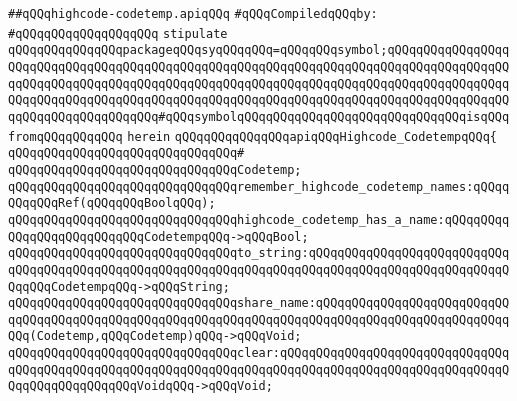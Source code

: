 \label{src/lib/compiler/back/top/highcode/highcode-codetemp.api}
\verb|##qQQqhighcode-codetemp.apiqQQq|\newline
\newline
\verb|#qQQqCompiledqQQqby:|\newline
\verb|#qQQqqQQqqQQqqQQqqQQq|\newline
\newline
\newline
\newline
\verb|stipulate|\newline
\verb|qQQqqQQqqQQqqQQqpackageqQQqsyqQQqqQQq=qQQqqQQqsymbol;qQQqqQQqqQQqqQQqqQQqqQQqqQQqqQQqqQQqqQQqqQQqqQQqqQQqqQQqqQQqqQQqqQQqqQQqqQQqqQQqqQQqqQQqqQQqqQQqqQQqqQQqqQQqqQQqqQQqqQQqqQQqqQQqqQQqqQQqqQQqqQQqqQQqqQQqqQQqqQQqqQQqqQQqqQQqqQQqqQQqqQQqqQQqqQQqqQQqqQQqqQQqqQQqqQQqqQQqqQQqqQQqqQQqqQQqqQQqqQQqqQQqqQQq#qQQqsymbolqQQqqQQqqQQqqQQqqQQqqQQqqQQqqQQqisqQQqfromqQQqqQQqqQQq|\newline
\verb|herein|\newline
\verb|qQQqqQQqqQQqqQQqapiqQQqHighcode_CodetempqQQq{|\newline
\verb|qQQqqQQqqQQqqQQqqQQqqQQqqQQqqQQq#|\newline
\verb|qQQqqQQqqQQqqQQqqQQqqQQqqQQqqQQqCodetemp;|\newline
\newline
\verb|qQQqqQQqqQQqqQQqqQQqqQQqqQQqqQQqremember_highcode_codetemp_names:qQQqqQQqqQQqRef(qQQqqQQqBoolqQQq);|\newline
\verb|qQQqqQQqqQQqqQQqqQQqqQQqqQQqqQQqhighcode_codetemp_has_a_name:qQQqqQQqqQQqqQQqqQQqqQQqqQQqCodetempqQQq->qQQqBool;|\newline
\verb|qQQqqQQqqQQqqQQqqQQqqQQqqQQqqQQqto_string:qQQqqQQqqQQqqQQqqQQqqQQqqQQqqQQqqQQqqQQqqQQqqQQqqQQqqQQqqQQqqQQqqQQqqQQqqQQqqQQqqQQqqQQqqQQqqQQqqQQqqQQqCodetempqQQq->qQQqString;|\newline
\verb|qQQqqQQqqQQqqQQqqQQqqQQqqQQqqQQqshare_name:qQQqqQQqqQQqqQQqqQQqqQQqqQQqqQQqqQQqqQQqqQQqqQQqqQQqqQQqqQQqqQQqqQQqqQQqqQQqqQQqqQQqqQQqqQQqqQQqqQQq(Codetemp,qQQqCodetemp)qQQq->qQQqVoid;|\newline
\newline
\verb|qQQqqQQqqQQqqQQqqQQqqQQqqQQqqQQqclear:qQQqqQQqqQQqqQQqqQQqqQQqqQQqqQQqqQQqqQQqqQQqqQQqqQQqqQQqqQQqqQQqqQQqqQQqqQQqqQQqqQQqqQQqqQQqqQQqqQQqqQQqqQQqqQQqqQQqqQQqVoidqQQq->qQQqVoid;|\newline
